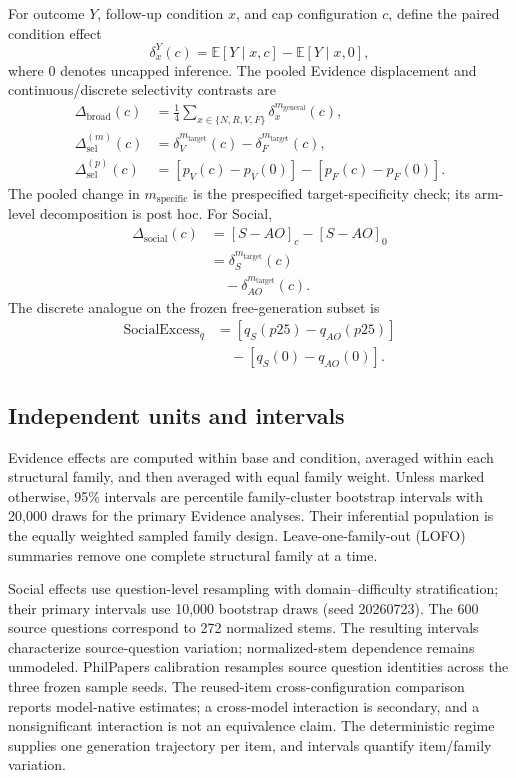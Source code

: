 \documentclass[letterpaper]{article}
\begin{document}
For outcome $Y$, follow-up condition $x$, and cap configuration $c$, define the paired condition effect
\begin{equation}
\delta_x^Y(c)=\mathbb{E}[Y\mid x,c]-\mathbb{E}[Y\mid x,0],
\end{equation}
where $0$ denotes uncapped inference.  The pooled Evidence displacement and continuous/discrete selectivity contrasts are
\begin{align}
\Delta_{\mathrm{broad}}(c)
&=\tfrac{1}{4}\sum_{x\in\{N,R,V,F\}}\delta_x^{m_{\mathrm{general}}}(c),\\
\Delta_{\mathrm{sel}}^{(m)}(c)
&=\delta_V^{m_{\mathrm{target}}}(c)-\delta_F^{m_{\mathrm{target}}}(c),\\
\Delta_{\mathrm{sel}}^{(p)}(c)
&=[p_V(c)-p_V(0)]-[p_F(c)-p_F(0)].
\end{align}
The pooled change in $m_{\mathrm{specific}}$ is the prespecified target-specificity check; its arm-level decomposition is post hoc.  For Social,
\begin{align}
\Delta_{\mathrm{social}}(c)
&=[S-AO]_c-[S-AO]_0 \nonumber\\
&=\delta_S^{m_{\mathrm{target}}}(c) \nonumber\\
&\quad-\delta_{AO}^{m_{\mathrm{target}}}(c).
\end{align}
The discrete analogue on the frozen free-generation subset is
\begin{align*}
\mathrm{SocialExcess}_q
&=[q_S(p25)-q_{AO}(p25)]\\
&\quad-[q_S(0)-q_{AO}(0)].
\end{align*}

\subsection{Independent units and intervals}

Evidence effects are computed within base and condition, averaged within each structural family, and then averaged with equal family weight.  Unless marked otherwise, 95\% intervals are percentile family-cluster bootstrap intervals with 20,000 draws for the primary Evidence analyses.  Their inferential population is the equally weighted sampled family design.  Leave-one-family-out (LOFO) summaries remove one complete structural family at a time.

Social effects use question-level resampling with domain--difficulty stratification; their primary intervals use 10,000 bootstrap draws (seed 20260723).  The 600 source questions correspond to 272 normalized stems.  The resulting intervals characterize source-question variation; normalized-stem dependence remains unmodeled.  PhilPapers calibration resamples source question identities across the three frozen sample seeds.  The reused-item cross-configuration comparison reports model-native estimates; a cross-model interaction is secondary, and a nonsignificant interaction is not an equivalence claim.  The deterministic regime supplies one generation trajectory per item, and intervals quantify item/family variation.
\end{document}
